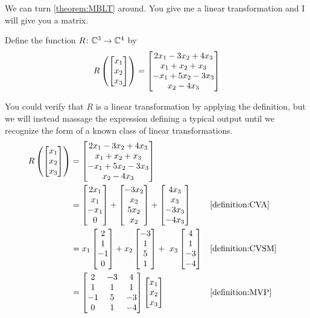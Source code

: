 \documentclass{ximera}
\begin{document}
We can turn \ref{theorem:MBLT} around.  You give me a linear transformation and I will give you a matrix.



\begin{example}

Define the function $R\colon \mathbb{C}^{3}\rightarrow\mathbb{C}^{4}$ by
\[
R\left(\begin{bmatrix}x_1\\x_2\\x_3\end{bmatrix}\right)=
\begin{bmatrix}2x_1-3x_2+4x_3\\x_1+x_2+x_3\\-x_1+5x_2-3x_3\\x_2-4x_3\end{bmatrix}
\]



You could verify that $R$ is a linear transformation by applying the definition, but we will instead massage the expression defining a typical output until we recognize the form of a known class of linear transformations.
\begin{align*}
R\left(\begin{bmatrix}x_1\\x_2\\x_3\end{bmatrix}\right)&=
\begin{bmatrix}2x_1-3x_2+4x_3\\x_1+x_2+x_3\\-x_1+5x_2-3x_3\\x_2-4x_3\end{bmatrix}\\
&=
\begin{bmatrix}2x_1\\x_1\\-x_1\\0\end{bmatrix}+
\begin{bmatrix}-3x_2\\x_2\\5x_2\\x_2\end{bmatrix}+
\begin{bmatrix}4x_3\\x_3\\-3x_3\\-4x_3\end{bmatrix}&&\ref{definition:CVA}\\
&=
x_1\begin{bmatrix}2\\1\\-1\\0\end{bmatrix}+
x_2\begin{bmatrix}-3\\1\\5\\1\end{bmatrix}+\
x_3\begin{bmatrix}4\\1\\-3\\-4\end{bmatrix}&&\ref{definition:CVSM}\\
&=
\begin{bmatrix}
2&-3&4\\
1&1&1\\
-1&5&-3\\
0&1&-4
\end{bmatrix}
\begin{bmatrix}x_1\\x_2\\x_3\end{bmatrix}&&\ref{definition:MVP}
\end{align*}





\end{example}
\end{document}
